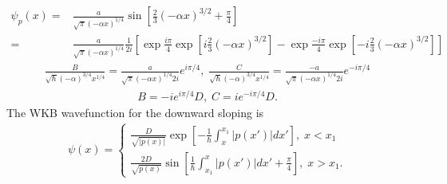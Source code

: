 \begin{align*}
    \psi_p(x)=&\frac{a}{\sqrt{\pi}(-\alpha x)^{1/4}}
    \sin\left[
    \frac{2}{3}
    (-\alpha x)^{3/2}+\frac{\pi}{4}
    \right]\\
    =&
    \frac{a}{\sqrt{\pi}(-\alpha x)^{1/4}}
    \frac{1}{2i}
    \left[
    \exp\frac{i\pi}{4}
    \exp\left[
    i\frac{2}{3}
    (-\alpha x)^{3/2}
    \right]
    -
    \exp\frac{-i\pi}{4}
    \exp\left[
    -i\frac{2}{3}
    (-\alpha x)^{3/2}
    \right]
    \right]
\end{align*}
\begin{align*}
    \frac{B}{\sqrt{\hbar}(-\alpha)^{3/4}x^{1/4}}
    =\frac{a}{\sqrt{\pi}(-\alpha x)^{1/4}2i}e^{i\pi /4},\;
    \frac{C}{\sqrt{\hbar}(-\alpha)^{3/4}x^{1/4}}
    =\frac{-a}{\sqrt{\pi}(-\alpha x)^{1/4}2i}e^{-i\pi /4}
\end{align*}
\begin{align*}
    B = -ie^{i\pi /4}D,\;
    C =ie^{-i\pi /4}D.
\end{align*}
The WKB wavefunction for the downward sloping is
\begin{align*}
    \psi(x)=
    \begin{cases}
    \frac{D}{\sqrt{|p(x)|}}\exp\left[
    -\frac{1}{\hbar}\int_x^{x_1}|p(x')|dx'
    \right],\; x<x_1\\
    \frac{2D}{\sqrt{p(x)}}
    \sin\left[
    \frac{1}{\hbar}\int_{x_1}^x|p(x')|dx'
    +\frac{\pi}{4}
    \right],\; x>x_1.
    \end{cases}
\end{align*}

